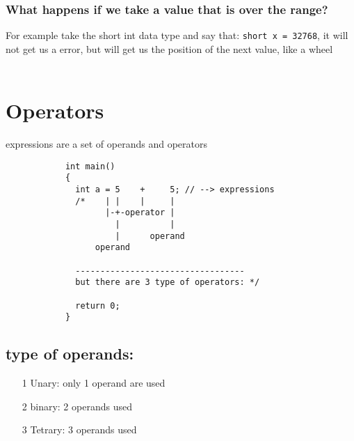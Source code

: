             \subsubsection{What happens if we take a value that is over the range?}
                For example take the short int data type and say that: \texttt{short x = 32768}, it will not get us a error, but will get us the position of the next value, like a wheel \\ \\

        \section{Operators}
          expressions are a set of operands and operators
          \begin{lstlisting}
            int main()
            {
              int a = 5    +     5; // --> expressions
              /*    | |    |     |
                    |-+-operator |
                      |          |
                      |      operand
                  operand 
                
              ----------------------------------
              but there are 3 type of operators: */

              return 0;
            }

        \end{lstlisting}
        
        \subsection{type of operands: }
          \begin{itemize}
            \item[1] Unary: only 1 operand are used
            \item[2] binary: 2 operands used
            \item[3] Tetrary: 3 operands used
          \end{itemize}

